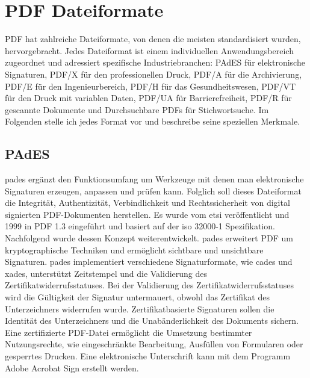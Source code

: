 \section{PDF Dateiformate}
PDF hat zahlreiche Dateiformate, von denen die meisten standardisiert wurden, hervorgebracht. Jedes Dateiformat ist einem individuellen Anwendungsbereich zugeordnet und adressiert spezifische Industriebranchen: PAdES für elektronische Signaturen, PDF/X für den professionellen Druck, PDF/A für die Archivierung, PDF/E für den Ingenieurbereich, PDF/H für das Gesundheitswesen, PDF/VT für den Druck mit variablen Daten, PDF/UA für Barrierefreiheit, PDF/R für gescannte Dokumente und Durchsuchbare PDFs für Stichwortsuche. Im Folgenden stelle ich jedes Format vor und beschreibe seine speziellen Merkmale. 

\subsection{PAdES}
\gls{pades} ergänzt den Funktionsumfang um Werkzeuge mit denen man elektronische Signaturen erzeugen, anpassen und prüfen kann. Folglich soll dieses Dateiformat die Integrität, Authentizität, Verbindlichkeit und Rechtssicherheit von digital signierten PDF-Dokumenten herstellen. Es wurde vom \gls{etsi} veröffentlicht und 1999 in PDF 1.3 eingeführt und basiert auf der \gls{iso} 32000-1 Spezifikation.  Nachfolgend wurde dessen Konzept weiterentwickelt. \gls{pades} erweitert PDF um kryptographische Techniken und ermöglicht sichtbare und unsichtbare Signaturen. \gls{pades} implementiert verschiedene Signaturformate, wie \gls{cades} und \gls{xades}, unterstützt Zeitstempel und die Validierung des Zertifikatwiderrufsstatuses. Bei der Validierung des Zertifikatwiderrufsstatuses wird die Gültigkeit der Signatur untermauert, obwohl das Zertifikat des Unterzeichners widerrufen wurde. Zertifikatbasierte Signaturen sollen die Identität des Unterzeichners und die Unabänderlichkeit des Dokuments sichern. Eine zertifizierte PDF-Datei ermöglicht die Umsetzung bestimmter Nutzungsrechte, wie eingeschränkte Bearbeitung, Ausfüllen von Formularen oder gesperrtes Drucken. Eine elektronische Unterschrift kann mit dem Programm Adobe Acrobat Sign erstellt werden. \cite{adobe-pdf-pades}


